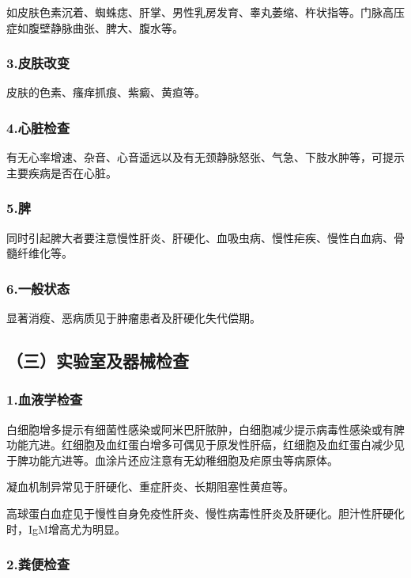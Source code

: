 如皮肤色素沉着、蜘蛛痣、肝掌、男性乳房发育、睾丸萎缩、杵状指等。门脉高压症如腹壁静脉曲张、脾大、腹水等。

\subsubsection{3.皮肤改变}

皮肤的色素、瘙痒抓痕、紫癜、黄疸等。

\subsubsection{4.心脏检查}

有无心率增速、杂音、心音遥远以及有无颈静脉怒张、气急、下肢水肿等，可提示主要疾病是否在心脏。

\subsubsection{5.脾}

同时引起脾大者要注意慢性肝炎、肝硬化、血吸虫病、慢性疟疾、慢性白血病、骨髓纤维化等。

\subsubsection{6.一般状态}

显著消瘦、恶病质见于肿瘤患者及肝硬化失代偿期。

\subsection{（三）实验室及器械检查}

\subsubsection{1.血液学检查}

白细胞增多提示有细菌性感染或阿米巴肝脓肿，白细胞减少提示病毒性感染或有脾功能亢进。红细胞及血红蛋白增多可偶见于原发性肝癌，红细胞及血红蛋白减少见于脾功能亢进等。血涂片还应注意有无幼稚细胞及疟原虫等病原体。

凝血机制异常见于肝硬化、重症肝炎、长期阻塞性黄疸等。

高球蛋白血症见于慢性自身免疫性肝炎、慢性病毒性肝炎及肝硬化。胆汁性肝硬化时，IgM增高尤为明显。

\subsubsection{2.粪便检查}

